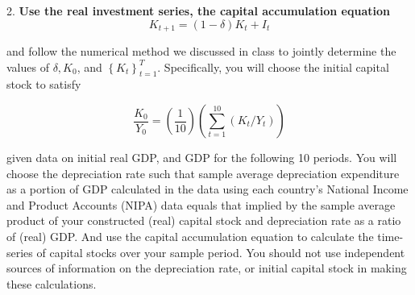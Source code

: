 \documentclass[11pt]{article}
\theoremstyle{mytheoremstyle}
\theoremstyle{mytheoremstyle}
\theoremstyle{myproblemstyle}
\begin{document}

2. \textbf{Use the real investment series, the capital accumulation equation}
$$
K_{t+1}=(1-\delta) K_t+I_t
$$

and follow the numerical method we discussed in class to jointly determine the values of $\delta, K_0$, and $\left\{K_t\right\}_{t=1}^T$. Specifically, you will choose the initial capital stock to satisfy

$$
\frac{K_0}{Y_0}=\left(\frac{1}{10}\right)\left(\sum_{t=1}^{10}\left(K_t / Y_t\right)\right)
$$

given data on initial real GDP, and GDP for the following 10 periods. You will choose the depreciation rate such that sample average depreciation expenditure as a portion of GDP calculated in the data using each country's National Income and Product Accounts (NIPA) data equals that implied by the sample average product of your constructed (real) capital stock and depreciation rate as a ratio of (real) GDP. And use the capital accumulation equation to calculate the time-series of capital stocks over your sample period. You should not use independent sources of information on the depreciation rate, or initial capital stock in making these calculations.
\end{document}
